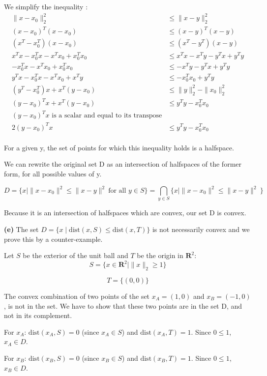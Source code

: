 \documentclass{article}
\begin{document}
We simplify the inequality : 
\begin{align*}
\|x - x_0\|_2^2 &\leq \|x - y\|_2^2 \\
(x - x_0)^T (x - x_0) &\leq (x - y)^T (x - y) \\
(x^T - x_0^T)(x - x_0) &\leq (x^T - y^T)(x - y) \\
x^T x - x_0^T x - x^T x_0 + x_0^T x_0 &\leq x^T x - x^T y - y^T x + y^T y \\
-x_0^T x - x^T x_0 + x_0^T x_0 &\leq -x^T y - y^T x + y^T y \\
y^T x - x_0^T x - x^T x_0 + x^T y &\leq -x_0^T x_0 + y^T y \\
(y^T - x_0^T)x + x^T(y - x_0) &\leq \|y\|_2^2 - \|x_0\|_2^2 \\
(y - x_0)^T x + x^T(y - x_0) &\leq y^T y - x_0^T x_0 \\ 
\text{$(y-x_0)^Tx$ is a scalar and equal to its transpose} \\ 
2 (y - x_0)^T x &\leq y^T y - x_0^T x_0 \\
\end{align*}

For a given y, the set of points for which this inequality holds is a halfspace.

We can rewrite the  original set D as an intersection of halfspaces of the former form, for all possible values of y. 

\[D = \{ x \mid \|x - x_0\|^2 \le \|x - y\|^2 \ \text{for all } y \in S \} = \bigcap_{y\in S}\{ x \mid \|x - x_0\|^2 \le \|x - y\|^2 \ \} \]

Because it is an intersection of halfspaces which are convex, our set D is convex.


\newpage
\textbf{(e)} The set $D = \{x \mid \text{dist}(x,S) \le \text{dist}(x,T)\}$ is not necessarily convex and we prove this by a counter-example. 


Let $S$ be the exterior of the unit ball and $T$ be the origin in $\mathbf{R}^2$:
 \[S = \{x \in \mathbf{R}^2 \mid \|x\|_2 \ge 1\}\]

 \[T = \{(0,0)\}\]

The convex combination of two points of the set  $x_A = (1, 0)$ and $x_B = (-1, 0)$ , is not in the set. 
We have to show that these two points are in the set D, and not in its complement.

For $x_A$: $\text{dist}(x_A, S) = 0$ (since $x_A \in S$) and $\text{dist}(x_A, T) = 1$. Since $0 \le 1$, $x_A \in D$.

For $x_B$: $\text{dist}(x_B, S) = 0$ (since $x_B \in S$) and $\text{dist}(x_B, T) = 1$. Since $0 \le 1$, $x_B \in D$.
\end{document}

